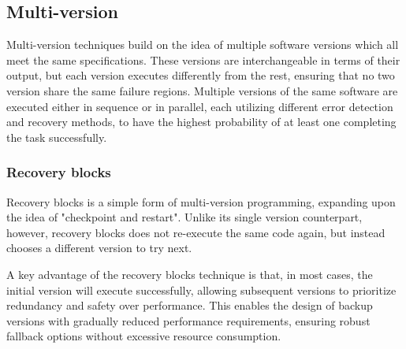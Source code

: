 \documentclass[12pt, letterpaper]{article}
\begin{document}
\subsection{Multi-version} \label{multi}

Multi-version techniques build on the idea of multiple software versions which all meet the same specifications. These versions are interchangeable in terms of their output, but each version executes differently from the rest, ensuring that no two version share the same failure regions.
Multiple versions of the same software are executed either in sequence or in parallel, each utilizing different error detection and recovery methods, to have the highest probability of at least one completing the task successfully.

\subsubsection{Recovery blocks}

Recovery blocks is a simple form of multi-version programming, expanding upon the idea of "checkpoint and restart". Unlike its single version counterpart, however, recovery blocks does not re-execute the same code again, but instead chooses a different version to try next.

A key advantage of the recovery blocks technique is that, in most cases, the initial version will execute successfully, allowing subsequent versions to prioritize redundancy and safety over performance. This enables the design of backup versions with gradually reduced performance requirements, ensuring robust fallback options without excessive resource consumption.
\end{document}
